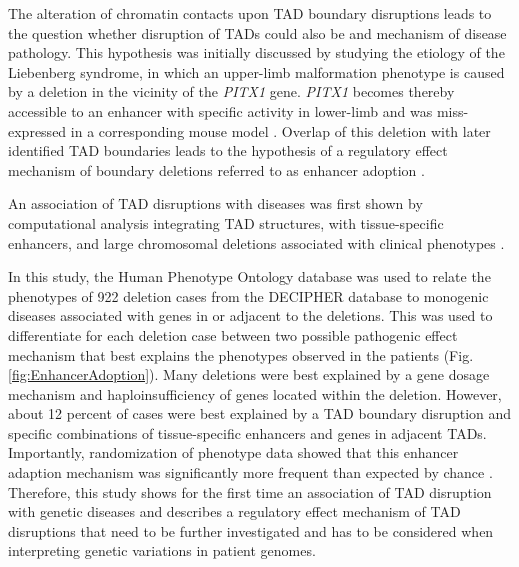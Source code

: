 \documentclass[a4paper,twoside=true,openright,parskip=full,chapterprefix=true,11pt,headings=normal,bibliography=totoc,listof=totoc,titlepage=on,captions=tableabove,draft=false]{scrreprt}
\theoremstyle{definition}
\theoremstyle{definition}
\theoremstyle{definition}
\theoremstyle{remark}
\begin{document}
The alteration of chromatin contacts upon TAD boundary disruptions leads
to the question whether disruption of TADs could also be and mechanism
of disease pathology. This hypothesis was initially discussed by
studying the etiology of the Liebenberg syndrome, in which an upper-limb
malformation phenotype is caused by a deletion in the vicinity of the
\emph{PITX1} gene. \emph{PITX1} becomes thereby accessible to an
enhancer with specific activity in lower-limb and was miss-expressed in
a corresponding mouse model \citep{Spielmann2012}. Overlap of this
deletion with later identified TAD boundaries leads to the hypothesis of
a regulatory effect mechanism of boundary deletions referred to as
enhancer adoption \citep{Spielmann2013a}.

An association of TAD disruptions with diseases was first shown by
computational analysis integrating TAD structures, with tissue-specific
enhancers, and large chromosomal deletions associated with clinical
phenotypes \citep{Ibn-Salem2014}.

In this study, the Human Phenotype Ontology database \citep{Kohler2014}
was used to relate the phenotypes of 922 deletion cases from the
DECIPHER database \citep{Firth2009} to monogenic diseases associated
with genes in or adjacent to the deletions. This was used to
differentiate for each deletion case between two possible pathogenic
effect mechanism that best explains the phenotypes observed in the
patients (Fig. \ref{fig:EnhancerAdoption}). Many deletions were best
explained by a gene dosage mechanism and haploinsufficiency of genes
located within the deletion. However, about 12 percent of cases were
best explained by a TAD boundary disruption and specific combinations of
tissue-specific enhancers and genes in adjacent TADs. Importantly,
randomization of phenotype data showed that this enhancer adaption
mechanism was significantly more frequent than expected by chance
\citep{Ibn-Salem2014}. Therefore, this study shows for the first time an
association of TAD disruption with genetic diseases and describes a
regulatory effect mechanism of TAD disruptions that need to be further
investigated and has to be considered when interpreting genetic
variations in patient genomes.
\end{document}
